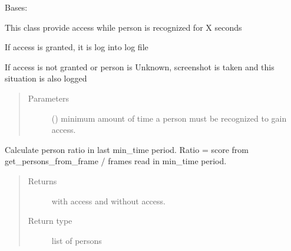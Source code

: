 \documentclass[letterpaper,10pt,english]{sphinxmanual}
\begin{document}
\begin{fulllineitems}
\label{\detokenize{doc/Access/AccesAfterTime:AccesAfterTime.AccessAfterTime}}
Bases: 

\begin{DUlineblock}{0em}
\item[] This class provide access while person is recognized for X seconds
\item[] If access is granted, it is log into log file
\item[] If access is not granted or person is Unknown, screenshot is taken and this situation is also logged
\end{DUlineblock}
\begin{quote}\begin{description}
\item[{Parameters}] \leavevmode
{} () \textendash{} minimum amount of time a person must be recognized to gain access.

\end{description}\end{quote}

\begin{fulllineitems}
\label{\detokenize{doc/Access/AccesAfterTime:AccesAfterTime.AccessAfterTime.access_after_time}}
Calculate person ratio in last min\_time period. Ratio =
score from get\_persons\_from\_frame / frames read in min\_time period.
\begin{quote}\begin{description}
\item[{Returns}] \leavevmode
with access and without access.

\item[{Return type}]  list of persons

\end{description}\end{quote}

\end{fulllineitems}


\end{fulllineitems}
\end{document}
